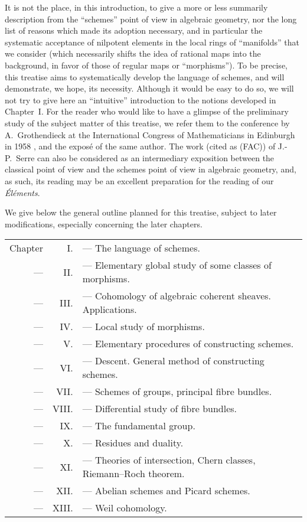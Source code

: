 \sectionbreak

It is not the place, in this introduction, to give a more or less summarily description from the ``schemes'' point of view in algebraic geometry, nor the long list of reasons which made its adoption necessary, and in particular the systematic acceptance of nilpotent elements in the local rings of ``manifolds'' that we consider (which necessarily shifts the idea of rational maps into the background, in favor of those of regular maps or ``morphisms'').
To be precise, this treatise aims to systematically develop the language of schemes, and will demonstrate, we hope, its necessity.
Although it would be easy to do so, we will not try to give here an ``intuitive'' introduction to the notions developed in Chapter~I.
For the reader who would like to have a glimpse of the preliminary study of the subject matter of this treatise, we refer them to the conference by A.~Grothendieck at the International Congress of Mathematicians in Edinburgh in 1958 \cite{I-7}, and the expos\'e \cite{I-8} of the same author.
The work \cite{I-14} (cited as (FAC)) of J.-P.~Serre can also be considered as an intermediary exposition between the classical point of view and the schemes point of view in algebraic geometry, and, as such, its reading may be an excellent preparation for the reading of our \emph{\'El\'ements}.

\sectionbreak

We give below the general outline planned for this treatise, subject to later modifications, especially concerning the later chapters.

\begin{tabular}{rrl}
Chapter & I. & --- The language of schemes.\\
--- & II. & --- Elementary global study of some classes of morphisms.\\
--- & III. & --- Cohomology of algebraic coherent sheaves. Applications.\\
--- & IV. & --- Local study of morphisms.\\
--- & V. & --- Elementary procedures of constructing schemes.\\
--- & VI. & --- Descent. General method of constructing schemes.\\
--- & VII. & --- Schemes of groups, principal fibre bundles.\\
--- & VIII. & --- Differential study of fibre bundles.\\
--- & IX. & --- The fundamental group.\\
--- & X. & --- Residues and duality.\\
--- & XI. & --- Theories of intersection, Chern classes,
Riemann--Roch theorem.\\
--- & XII. & --- Abelian schemes and Picard schemes.\\
--- & XIII. & --- Weil cohomology.
\end{tabular}\\

